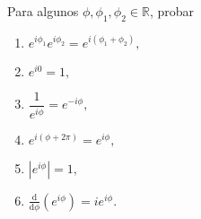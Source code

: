 \documentclass[twoside]{book}
\begin{document}
\begin{example}{}
    Para algunos $\phi,\phi_1,\phi_2\in\mathbb{R}$, probar
    \begin{multicols}{2}
        \begin{enumerate}[label=\alph*).]
            \item $e^{i\phi_1}e^{i\phi_2}=e^{i(\phi_1+\phi_2)},$
            \item $e^{i0}=1,$
            \item $\dfrac{1}{e^{i\phi}}=e^{-i\phi},$
            \item $e^{i(\phi+2\pi)}=e^{i\phi},$
            \item $|e^{i\phi}|=1,$
            \item $\displaystyle\frac{\mathrm d}{\mathrm d \phi} \left(e^{i\phi}\right)=ie^{i\phi}.$
        \end{enumerate}
    \end{multicols}

\end{example}
\end{document}
